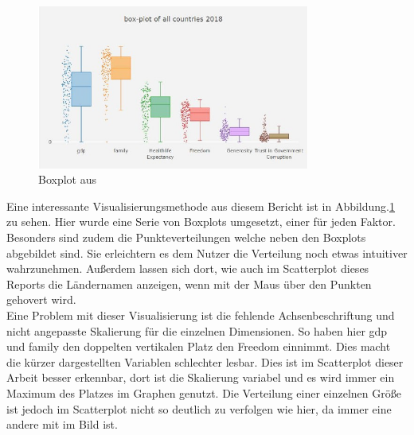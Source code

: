 \begin{figure}[h]
 \centering
 \includegraphics[width = 0.8\textwidth]{img/group12_boxplot.jpg}
 \caption{Boxplot aus \textcite{happiness_2018}}
 \label{fig:hap_2018}
\end{figure}

Eine interessante Visualisierungsmethode aus diesem Bericht ist in Abbildung.\ref{fig:hap_2018} zu sehen. Hier wurde eine Serie von Boxplots umgesetzt, einer für jeden Faktor. Besonders sind zudem die Punkteverteilungen welche neben den Boxplots abgebildet sind. Sie erleichtern es dem Nutzer die Verteilung noch etwas intuitiver wahrzunehmen. Außerdem lassen sich dort, wie auch im Scatterplot dieses Reports die Ländernamen anzeigen, wenn mit der Maus über den Punkten gehovert wird. \\

Eine Problem mit dieser Visualisierung ist die fehlende Achsenbeschriftung und nicht angepasste Skalierung für die einzelnen Dimensionen. So haben hier gdp und family den doppelten vertikalen Platz den Freedom einnimmt. Dies macht die kürzer dargestellten Variablen schlechter lesbar. Dies ist im Scatterplot dieser Arbeit besser erkennbar, dort ist die Skalierung variabel und es wird immer ein Maximum des Platzes im Graphen genutzt. Die Verteilung einer einzelnen Größe ist jedoch im Scatterplot nicht so deutlich zu verfolgen wie hier, da immer eine andere mit im Bild ist. 